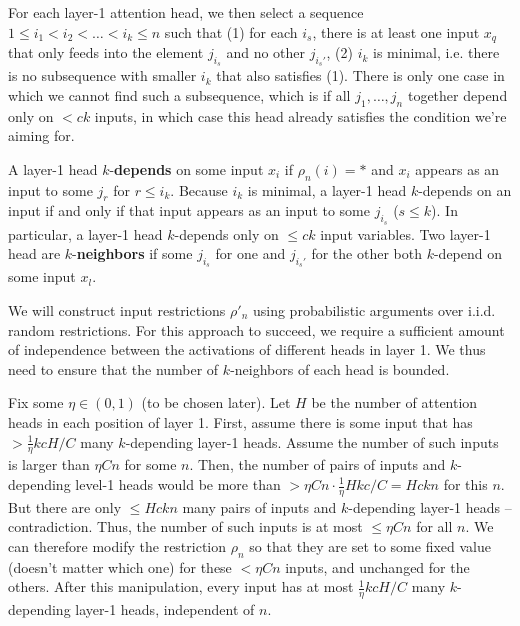 \documentclass[11pt,a4paper]{article}
\begin{document}
For each layer-1 attention head, we then select a sequence $1 \leq i_1 < i_2 < \dots < i_k \leq n$ such that (1) for each $i_s$, there is at least one input $x_q$ that only feeds into the element $j_{i_s}$ and no other $j_{i_s'}$, (2) $i_k$ is minimal, i.e. there is no subsequence with smaller $i_k$ that also satisfies (1).
There is only one case in which we cannot find such a subsequence, which is if all $j_1, \dots, j_n$ together depend only on $< ck$ inputs, in which case this head already satisfies the condition we're aiming for.

A layer-1 head $k$-\textbf{depends} on some input $x_i$ if $\rho_n(i) = *$ and $x_i$ appears as an input to some $j_r$ for $r \leq i_k$.
Because $i_k$ is minimal, a layer-1 head $k$-depends on an input if and only if that input appears as an input to some $j_{i_s}$ ($s \leq k$).
In particular, a layer-1 head $k$-depends only on $\leq ck$ input variables.
Two layer-1 head are $k$-\textbf{neighbors} if some $j_{i_s}$ for one and $j_{i_s'}$ for the other both $k$-depend on some input $x_l$.



We will construct input restrictions $\rho'_n$ using probabilistic arguments over i.i.d. random restrictions.
For this approach to succeed, we require a  sufficient amount of independence between the activations of different heads in layer 1.
We thus need to ensure that the number of $k$-neighbors of each head is bounded.

Fix some $\eta \in (0,1)$ (to be chosen later).
Let $H$ be the number of attention heads in each position of layer 1.
First, assume there is some input that has $>\frac{1}{\eta}kcH/C$ many $k$-depending layer-1 heads.
Assume the number of such inputs is larger than $\eta Cn$ for some $n$.
Then, the number of pairs of inputs and $k$-depending level-1 heads would be more than $> \eta C n \cdot \frac{1}{\eta} H k c/C = Hckn$ for this $n$.
But there are only $\leq Hckn$ many pairs of inputs and $k$-depending layer-1 heads -- contradiction.
Thus, the number of such inputs is at most $\leq \eta Cn$ for all $n$.
We can therefore modify the restriction $\rho_n$ so that they are set to some fixed value (doesn't matter which one) for these $<\eta Cn$ inputs, and unchanged for the others.
After this manipulation, every input has at most $\frac{1}{\eta}kcH/C$ many $k$-depending layer-1 heads, independent of $n$.
\end{document}
